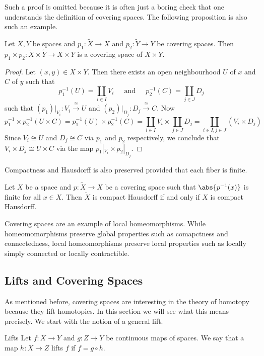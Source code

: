\documentclass[a4paper]{article}
\begin{document}
Such a proof is omitted because it is often just a boring check that one understands the definition of covering spaces. The following proposition is also such an example. 

\begin{prp}{}{} Let $X,Y$ be spaces and $p_1:\widetilde{X}\to X$ and $p_2:\widetilde{Y}\to Y$ be covering spaces. Then $p_1\times p_2:\widetilde{X}\times\widetilde{Y}\to X\times Y$ is a covering space of $X\times Y$. 
\begin{proof}
Let $(x,y)\in X\times Y$. Then there exists an open neighbourhood $U$ of $x$ and $C$ of $y$ such that $$p_1^{-1}(U)=\coprod_{i\in I}V_i\;\;\;\;\text{ and }\;\;\;\;p_2^{-1}(C)=\coprod_{j\in J}D_j$$ such that $(p_1)|_{V_i}:V_i\overset{\cong}{\longrightarrow}U$ and $(p_2)|_{D_j}:D_j\overset{\cong}{\longrightarrow}C$. Now $$p_1^{-1}\times p_2^{-1}(U\times C)=p_1^{-1}(U)\times p_2^{-1}(C)=\coprod_{i\in I}V_i\times\coprod_{j\in J}D_j=\coprod_{i\in I,j\in J}(V_i\times D_j)$$ Since $V_i\cong U$ and $D_j\cong C$ via $p_1$ and $p_2$ respectively, we conclude that $V_i\times D_j\cong U\times C$ via the map $p_1|_{V_i}\times p_2|_{D_j}$. 
\end{proof}
\end{prp}

Compactness and Hausdorff is also preserved provided that each fiber is finite. 

\begin{prp}{}{} Let $X$ be a space and $p:\widetilde{X}\to X$ be a covering space such that $\abs{p^{-1}(x)}$ is finite for all $x\in X$. Then $\widetilde{X}$ is compact Hausdorff if and only if $X$ is compact Hausdorff. 
\end{prp}

Covering spaces are an example of local homeomorphisms. While homeomomorphisms preserve global properties such as comapctness and connectedness, local homeomorphisms preserve local properties such as locally simply connected or locally contractible. 

\subsection{Lifts and Covering Spaces}
As mentioned before, covering spaces are interesting in the theory of homotopy because they lift homotopies. In this section we will see what this means precisely. We start with the notion of a general lift. 

\begin{defn}{Lifts}{} Let $f:X\to Y$ and $g:Z\to Y$ be continuous maps of spaces. We say that a map $h:X\to Z$ lifts $f$ if $f=g\circ h$. \\
\end{defn}
\end{document}
